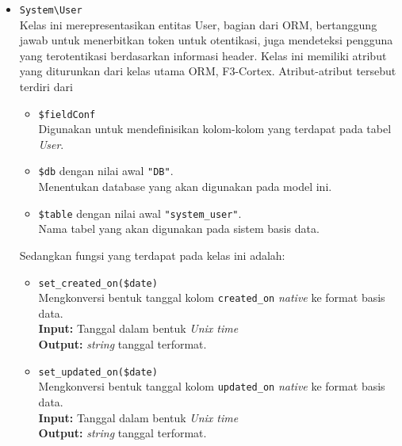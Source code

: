 \begin{itemize}
        \item \texttt{System\textbackslash User} \\
            Kelas ini merepresentasikan entitas User, bagian dari ORM,
            bertanggung jawab untuk menerbitkan token untuk otentikasi, juga
            mendeteksi pengguna yang terotentikasi berdasarkan informasi header.
            Kelas ini memiliki atribut yang diturunkan dari kelas utama ORM,
            F3-Cortex. Atribut-atribut tersebut terdiri dari
            \begin{itemize}
                \item \texttt{\$fieldConf}\\
                    Digunakan untuk mendefinisikan kolom-kolom yang terdapat
                    pada tabel \textit{User}.
                \item \texttt{\$db} dengan nilai awal \texttt{"DB"}. \\
                    Menentukan database yang akan digunakan pada model ini.
                \item \texttt{\$table} dengan nilai awal
                \texttt{"system\_user"}. \\
                    Nama tabel yang akan digunakan pada sistem basis data. 
            \end{itemize}
            Sedangkan fungsi yang terdapat pada kelas ini adalah:
            \begin{itemize}
                \item \texttt{set\_created\_on(\$date)} \\
                    Mengkonversi bentuk tanggal kolom \texttt{created\_on}
                    \textit{native} ke format basis data. \\
                    \textbf{Input:} Tanggal dalam bentuk \textit{Unix time}\\
                    \textbf{Output:} \textit{string} tanggal terformat.
                
                \item \texttt{set\_updated\_on(\$date)} \\
                    Mengkonversi bentuk tanggal kolom \texttt{updated\_on}
                    \textit{native} ke format basis data. \\
                    \textbf{Input:} Tanggal dalam bentuk \textit{Unix time}\\
                    \textbf{Output:} \textit{string} tanggal terformat.
                

\end{itemize}
\end{itemize}
